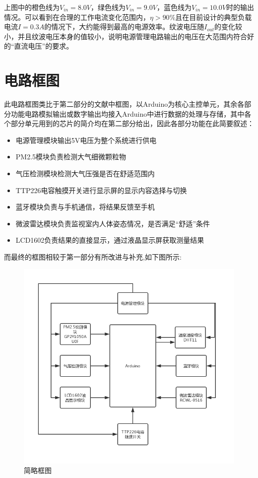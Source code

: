 \documentclass[a4paper, 11pt]{article} %
\begin{document}
上图中的橙色线为$V_{in} = 8.0V$，绿色线为$V_{in} = 9.0V$，蓝色线为$V_{in} = 10.0V$时的输出情况。可以看到在合理的工作电流变化范围内，$\eta > 90\%$且在目前设计的典型负载电流$I = 0.3A$的情况下，大约能得到最高的电源效率。纹波电压随$I_{out}$的变化较小，并且纹波电压本身的值较小，说明电源管理电路输出的电压在大范围内符合好的“直流电压”的要求。

\section{电路框图}
\par{} 此电路框图类比于第二部分的文献中框图，以Arduino为核心主控单元，其余各部分功能电路模拟输出或数字输出均接入Arduino中进行数据的处理与存储，其中各个部分单元用到的芯片的简介均在第二部分给出，因此各部分功能在此简要叙述：
\begin{itemize}
\item 电源管理模块输出5V电压为整个系统进行供电
\item PM2.5模块负责检测大气细微颗粒物
\item 气压检测模块检测大气压强是否在舒适范围内
\item TTP226电容触摸开关进行显示屏的显示内容选择与切换
\item 蓝牙模块负责与手机通信，将结果反馈至手机
\item 微波雷达模块负责监视室内人体姿态情况，是否满足“舒适”条件
\item LCD1602负责结果的直接显示，通过液晶显示屏获取测量结果


\end{itemize}
\par{} 而最终的框图相较于第一部分有所改进与补充,如下图所示:



\begin{figure}[H]
  \centering
  \includegraphics[scale = 0.45 ]{1-n.png}
  \caption{简略框图}
  \label{img6} 
\end{figure}
\end{document}
